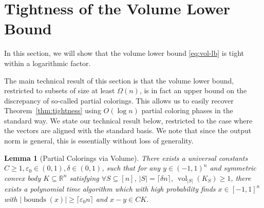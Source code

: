 \documentclass[11pt]{article}
\newtheorem{theorem}{Theorem}
\newtheorem{lemma}{Lemma}
\newcommand{\ceil}[1]{\lceil #1 \rceil}
\newcommand{\R}{{\mathbb{R}}}
\newcommand\eps{\varepsilon}
\DeclareMathOperator{\vollb}{volLB}
\DeclareMathOperator{\hd}{hd}
\DeclareMathOperator{\vol}{vol}
\DeclareMathOperator{\bnds}{bounds}
\newcommand{\notename}[2]{{\textcolor{red}{{\bf (#1:} {#2}{\bf ) }}}}
\newcommand{\notename}[2]{{\textcolor{red}{\footnotesize{\bf (#1:} {#2}{\bf ) }}}}
\newcommand{\dnote}[1]{{\notename{Daniel}{#1}}}
\newcommand{\notename}[2]{{}}
\newcommand{\dnote}[1]{}
\begin{document}
\section{Tightness of the Volume Lower Bound}
\label{sec:tightness}

In this section, we will show that the volume lower bound \eqref{eq:vol-lb} is
tight within a logarithmic factor. 

\tightvollb*

The main technical result of this section is that the volume lower bound,
restricted to subsets of size at least $\Omega(n)$, is in fact an upper bound on
the discrepancy of so-called partial colorings. This allows us to easily recover
Theorem~\ref{thm:tightness} using $O(\log n)$ partial coloring phases in the
standard way. We state our technical result below, restricted to the case where
the vectors are aligned with the standard basis. We note that since the output
norm is general, this is essentially without loss of generality. 

\begin{lemma}[Partial Colorings via Volume] \label{lem:partial-via-volume}
There exists a universal constants $C \geq 1, \eps_0 \in (0,1), \delta \in (0,1)$, such that
for any $y \in (-1,1)^n$ and symmetric convex body $K \subseteq \R^n$ satisfying
$\forall S \subseteq [n]$, $|S| = \ceil{\delta n}$, $\vol_{|S|}(K_S) \geq 1$, there
exists a polynomial time algorithm which with high probability finds $x \in
[-1,1]^n$ with $|\bnds(x)| \geq \ceil{\eps_0 n}$ and
$x-y \in C K$.  
\end{lemma}
\end{document}
